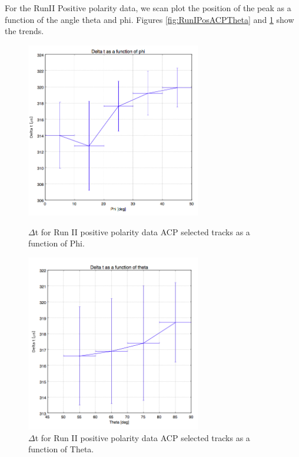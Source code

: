 For the RunII Positive polarity data, we scan plot the position of the peak as a function of the angle theta and phi. Figures \ref{fig:RunIPosACPTheta} and \ref{fig:RunIIPosACPPhi} show the trends.
\begin{figure}[b]
\centering
\begin{minipage}{0.45\textwidth}
\centering
\includegraphics[width=3in]{images/CollectionFitRunIIPosPhi.png}
\caption{$\Delta$t for Run II positive polarity data ACP selected tracks as a function of Phi. }
\label{fig:RunIPosACPTheta}
\end{minipage}\hfill
\begin{minipage}{0.45\textwidth}
\centering
\includegraphics[width=3in]{images/CollectionFitRunIIPosTheta.png}
\caption{$\Delta$t for Run II positive polarity data ACP selected tracks as a function of Theta.}
\label{fig:RunIIPosACPPhi}
\end{minipage}
\end{figure}
\clearpage
\newpage
